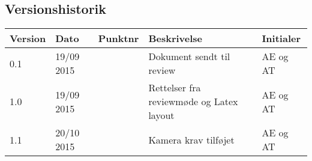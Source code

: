\subsection{Versionshistorik}
\begin{center}
		\begin{longtable}{ | m{2.5cm} | m{2.5cm}| m{2.5cm}| m{2.5cm}| m{2.5cm}| } 
			\hline
			\textbf{Version}  & \textbf{Dato} & \textbf{Punktnr} & \textbf{Beskrivelse} & \textbf{Initialer}  \\ 
			\hline
			0.1  &  19/09 2015 & & Dokument sendt til review & AE og AT \\
			\hline
		1.0  &  19/09 2015 & & Rettelser fra reviewmøde og Latex layout & AE og AT \\
		\hline
		1.1  &  20/10 2015 & & Kamera krav tilføjet & AE og AT \\
			\hline
		\end{longtable}
		
	\end{center}
